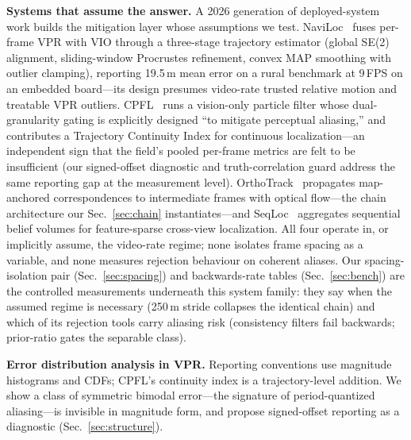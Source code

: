 \documentclass[journal]{IEEEtran}
\begin{document}
\textbf{Systems that assume the answer.} A 2026 generation of deployed-system work builds the mitigation layer whose assumptions we test. NaviLoc~\cite{naviloc} fuses per-frame VPR with VIO through a three-stage trajectory estimator (global SE(2) alignment, sliding-window Procrustes refinement, convex MAP smoothing with outlier clamping), reporting 19.5\,m mean error on a rural benchmark at 9\,FPS on an embedded board---its design presumes video-rate trusted relative motion and treatable VPR outliers. CPFL~\cite{cpfl} runs a vision-only particle filter whose dual-granularity gating is explicitly designed ``to mitigate perceptual aliasing,'' and contributes a Trajectory Continuity Index for continuous localization---an independent sign that the field's pooled per-frame metrics are felt to be insufficient (our signed-offset diagnostic and truth-correlation guard address the same reporting gap at the measurement level). OrthoTrack~\cite{orthotrack} propagates map-anchored correspondences to intermediate frames with optical flow---the chain architecture our Sec.~\ref{sec:chain} instantiates---and SeqLoc~\cite{seqloc} aggregates sequential belief volumes for feature-sparse cross-view localization. All four operate in, or implicitly assume, the video-rate regime; none isolates frame spacing as a variable, and none measures rejection behaviour on coherent aliases. Our spacing-isolation pair (Sec.~\ref{sec:spacing}) and backwards-rate tables (Sec.~\ref{sec:bench}) are the controlled measurements underneath this system family: they say when the assumed regime is necessary (250\,m stride collapses the identical chain) and which of its rejection tools carry aliasing risk (consistency filters fail backwards; prior-ratio gates the separable class).

\textbf{Error distribution analysis in VPR.} Reporting conventions use magnitude histograms and CDFs; CPFL's continuity index is a trajectory-level addition. We show a class of symmetric bimodal error---the signature of period-quantized aliasing---is invisible in magnitude form, and propose signed-offset reporting as a diagnostic (Sec.~\ref{sec:structure}).
\end{document}
